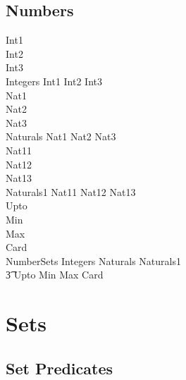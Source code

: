 \documentclass{article}
\begin{document}
\subsection{Numbers}
\begin{zed}
  Int1 \\
  Int2 \\
  Int3 \\
  Integers  Int1 \land Int2 \land Int3 \\
  \also
  Nat1 \\
  Nat2 \\
  Nat3 \\
  Naturals  Nat1 \land Nat2 \land Nat3 \\
  \also
  Nat11 \\
  Nat12 \\
  Nat13 \\
  Naturals1  Nat11 \land Nat12 \land Nat13 \\
  \also  
  Upto \\
  Min \\
  Max \\
  Card \\
  \also
  NumberSets  Integers \land Naturals \land Naturals1 \land {} \\
  \t3 Upto \land Min \land Max \land Card\\
\end{zed}

\section{Sets}

\subsection{Set Predicates}
\end{document}
